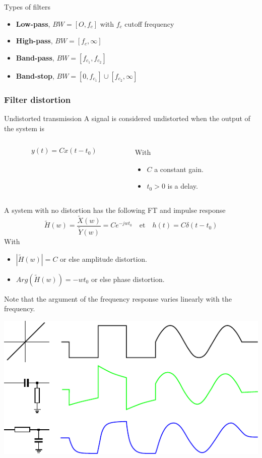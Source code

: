   \begin{block}{Types of filters}\vspace{-2mm}
    \begin{itemize}
      \item \textbf{Low-pass},  $BW=[O,f_c]$ with $f_c$ cutoff frequency 
      \item \textbf{High-pass}, $BW=[f_c,\infty]$
      \item \textbf{Band-pass}, $BW=[f_{c_1},f_{c_2}]$
      \item \textbf{Band-stop}, $BW=[0,f_{c_1}]\cup [f_{c_2},\infty]$
    \end{itemize}
  \end{block}

  \frametitle{Filter distortion}
  
  \begin{block}{Undistorted transmission}
A signal is considered undistorted when the output of the system is
\vspace{3mm}
    \begin{columns}
      \begin{column}%
        $$y(t)=Cx(t-t_0)$$
      \end{column}
      \begin{column}%
With
\begin{itemize}
\item $C$ a constant gain.
\item $t_0>0$ is a delay. 
\end{itemize}

      \end{column}
    \end{columns}
  \vspace{3mm}


A system with no distortion has the following FT and impulse response
$$\tilde H(w)=\frac{\tilde X(w)}{\tilde Y(w)}=%
{Ce^{-jwt_0}} \quad \text{et} \quad
h(t)=%
{C\delta(t-t_0)}$$
With
\begin{itemize}
\item $|\tilde H(w)|=C$ or else amplitude distortion.
\item $Arg(\tilde H(w))=-wt_0$ or else phase distortion.
\end{itemize}
Note that the argument of the frequency response varies linearly with the frequency.
  \end{block}


  \begin{center}
    \includegraphics[width=.4\linewidth]{imgs/fourier/distortion.pdf}
  \end{center}
  
